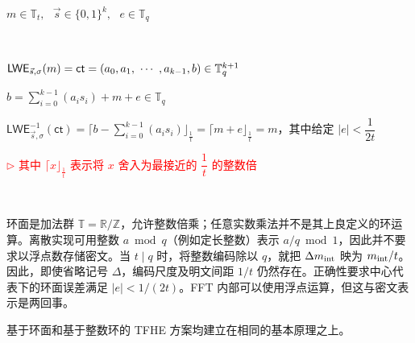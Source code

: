 $m \in \mathbb{T}_{t}, \text{ } \vec{s} \in \{0, 1\}^{k}, \text{ } e \in \mathbb{T}_{q}$

$ $

$\textsf{LWE}_{\vec{s}, \sigma}(m) = \textsf{ct} = (a_0, a_1, \text{ } \text{$\cdots$} \text{ }, a_{k-1}, b) \in \mathbb{T}_{q}^{k+1}$

$b = \sum\limits_{i=0}^{k-1}(a_is_i) + m + e \in \mathbb{T}_q$

$\textsf{LWE}_{\vec{s}, \sigma}^{-1}(\textsf{ct}) =  \Big\lceil b - \sum\limits_{i=0}^{k-1}(a_is_i) \Big\rfloor_{\frac{1}{t}} = \Big\lceil m + e \Big\rfloor_{\frac{1}{t}} = m$，其中给定 $|e| < \dfrac{1}{2t}$

\textcolor{red}{ $\rhd$ 其中 $\lceil x \rfloor_{\frac{1}{t}}$ 表示将 $x$ 舍入为最接近的 $\dfrac{1}{t}$ 的整数倍}

$ $

环面是加法群 $\mathbb T=\mathbb R/\mathbb Z$，允许整数倍乘；任意实数乘法并不是其上良定义的环运算。离散实现可用整数 $a\bmod q$（例如定长整数）表示 $a/q\bmod1$，因此并不要求以浮点数存储密文。当 $t\mid q$ 时，将整数编码除以 $q$，就把 $\Delta m_{\rm int}$ 映为 $m_{\rm int}/t$。因此，即使省略记号 $\Delta$，编码尺度及明文间距 $1/t$ 仍然存在。正确性要求中心代表下的环面误差满足 $|e|<1/(2t)$。FFT 内部可以使用浮点运算，但这与密文表示是两回事。

基于环面和基于整数环的 TFHE 方案均建立在相同的基本原理之上。

